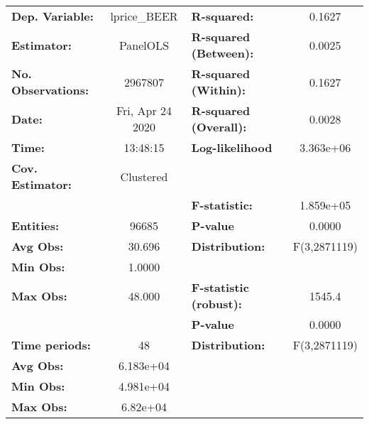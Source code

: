 \documentclass{report}
\begin{document}
\begin{center}
\begin{tabular}{lclc}
\toprule
\textbf{Dep. Variable:}       &    lprice\_BEER    & \textbf{  R-squared:         }   &      0.1627      \\
\textbf{Estimator:}           &      PanelOLS      & \textbf{  R-squared (Between):}  &      0.0025      \\
\textbf{No. Observations:}    &      2967807       & \textbf{  R-squared (Within):}   &      0.1627      \\
\textbf{Date:}                &  Fri, Apr 24 2020  & \textbf{  R-squared (Overall):}  &      0.0028      \\
\textbf{Time:}                &      13:48:15      & \textbf{  Log-likelihood     }   &    3.363e+06     \\
\textbf{Cov. Estimator:}      &     Clustered      & \textbf{                     }   &                  \\
\textbf{}                     &                    & \textbf{  F-statistic:       }   &    1.859e+05     \\
\textbf{Entities:}            &       96685        & \textbf{  P-value            }   &      0.0000      \\
\textbf{Avg Obs:}             &       30.696       & \textbf{  Distribution:      }   &   F(3,2871119)   \\
\textbf{Min Obs:}             &       1.0000       & \textbf{                     }   &                  \\
\textbf{Max Obs:}             &       48.000       & \textbf{  F-statistic (robust):} &      1545.4      \\
\textbf{}                     &                    & \textbf{  P-value            }   &      0.0000      \\
\textbf{Time periods:}        &         48         & \textbf{  Distribution:      }   &   F(3,2871119)   \\
\textbf{Avg Obs:}             &     6.183e+04      & \textbf{                     }   &                  \\
\textbf{Min Obs:}             &     4.981e+04      & \textbf{                     }   &                  \\
\textbf{Max Obs:}             &      6.82e+04      & \textbf{                     }   &                  \\
\bottomrule
\end{tabular}
\begin{tabular}{lcccccc}

\end{tabular}
\end{center}
\end{document}
